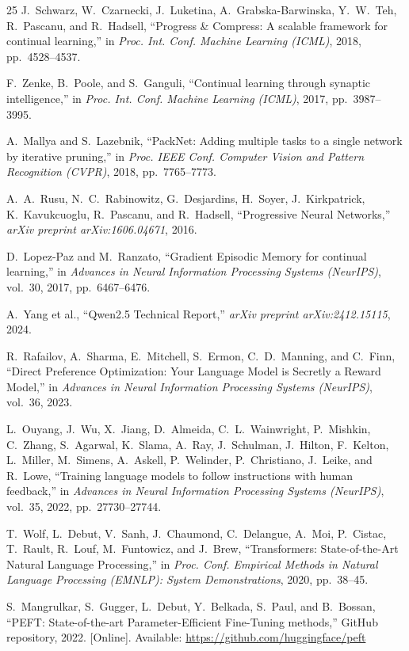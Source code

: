 \documentclass[12pt,a4paper]{report}
\begin{document}
\begin{thebibliography}{25}
J.~Schwarz, W.~Czarnecki, J.~Luketina, A.~Grabska-Barwinska, Y.~W.~Teh, R.~Pascanu, and R.~Hadsell, ``Progress \& Compress: A scalable framework for continual learning,'' in \textit{Proc. Int. Conf. Machine Learning (ICML)}, 2018, pp.~4528--4537.

F.~Zenke, B.~Poole, and S.~Ganguli, ``Continual learning through synaptic intelligence,'' in \textit{Proc. Int. Conf. Machine Learning (ICML)}, 2017, pp.~3987--3995.

A.~Mallya and S.~Lazebnik, ``PackNet: Adding multiple tasks to a single network by iterative pruning,'' in \textit{Proc. IEEE Conf. Computer Vision and Pattern Recognition (CVPR)}, 2018, pp.~7765--7773.

A.~A.~Rusu, N.~C.~Rabinowitz, G.~Desjardins, H.~Soyer, J.~Kirkpatrick, K.~Kavukcuoglu, R.~Pascanu, and R.~Hadsell, ``Progressive Neural Networks,'' \textit{arXiv preprint arXiv:1606.04671}, 2016.

D.~Lopez-Paz and M.~Ranzato, ``Gradient Episodic Memory for continual learning,'' in \textit{Advances in Neural Information Processing Systems (NeurIPS)}, vol.~30, 2017, pp.~6467--6476.

A.~Yang et al., ``Qwen2.5 Technical Report,'' \textit{arXiv preprint arXiv:2412.15115}, 2024.

R.~Rafailov, A.~Sharma, E.~Mitchell, S.~Ermon, C.~D.~Manning, and C.~Finn, ``Direct Preference Optimization: Your Language Model is Secretly a Reward Model,'' in \textit{Advances in Neural Information Processing Systems (NeurIPS)}, vol.~36, 2023.

L.~Ouyang, J.~Wu, X.~Jiang, D.~Almeida, C.~L.~Wainwright, P.~Mishkin, C.~Zhang, S.~Agarwal, K.~Slama, A.~Ray, J.~Schulman, J.~Hilton, F.~Kelton, L.~Miller, M.~Simens, A.~Askell, P.~Welinder, P.~Christiano, J.~Leike, and R.~Lowe, ``Training language models to follow instructions with human feedback,'' in \textit{Advances in Neural Information Processing Systems (NeurIPS)}, vol.~35, 2022, pp.~27730--27744.

T.~Wolf, L.~Debut, V.~Sanh, J.~Chaumond, C.~Delangue, A.~Moi, P.~Cistac, T.~Rault, R.~Louf, M.~Funtowicz, and J.~Brew, ``Transformers: State-of-the-Art Natural Language Processing,'' in \textit{Proc. Conf. Empirical Methods in Natural Language Processing (EMNLP): System Demonstrations}, 2020, pp.~38--45.

S.~Mangrulkar, S.~Gugger, L.~Debut, Y.~Belkada, S.~Paul, and B.~Bossan, ``PEFT: State-of-the-art Parameter-Efficient Fine-Tuning methods,'' GitHub repository, 2022. [Online]. Available: \url{https://github.com/huggingface/peft}


\end{thebibliography}
\end{document}
